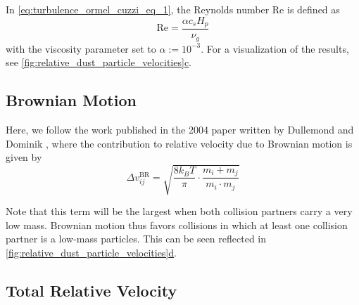         In \cref{eq:turbulence_ormel_cuzzi_eq_1}, the Reynolds number $\text{Re}$ is defined as
        \begin{equation}
            \text{Re} = \frac{\alpha c_s H_p}{\nu_g}
        \end{equation}
        with the viscosity parameter set to $\alpha := 10^{-3}$. 
        For a visualization of the results, see \hyperref[fig:relative_dust_particle_velocities]
        {\cref*{fig:relative_dust_particle_velocities}c}.

    \clearpage\subsection{Brownian Motion}

        Here, we follow the work published in the 2004 paper written by Dullemond and Dominik 
        \cite{dullemond_dominik_2004}, where the contribution to relative velocity due to Brownian 
        motion is given by
        \begin{equation}
            \Delta v_{ij}^\text{BR}
            =\sqrt{\frac{8k_BT}{\pi}\cdot\frac{m_i+m_j}{m_i\cdot m_j}}
        \end{equation}

        Note that this term will be the largest when both collision partners carry a very low mass.
        Brownian motion thus favors collisions in which at least one collision partner is a 
        low-mass particles. This can be seen reflected in 
        \hyperref[fig:relative_dust_particle_velocities]{
        \cref*{fig:relative_dust_particle_velocities}d}.

    \subsection{Total Relative Velocity}

